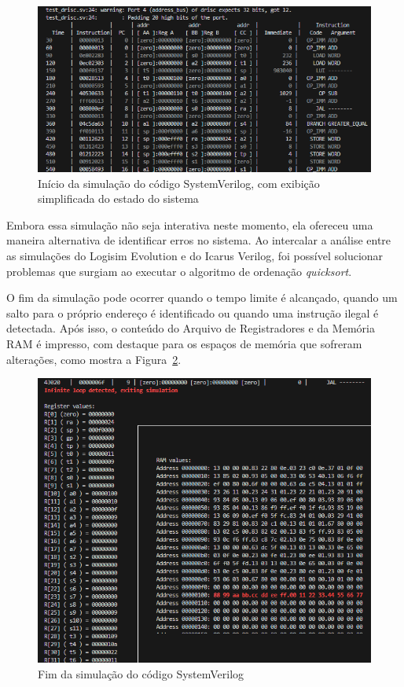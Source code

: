 \documentclass[
	12pt,				%
	openright,			%
	oneside,			%
	a4paper,			%
	english,			%
	french,				%
	spanish,			%
	brazil,				%
	]{abntex2}
\begin{document}
\begin{figure}[h]
    \centering
    \includegraphics[width=0.75\linewidth]{ProcessoDesenvolvimento/Arquitetura/sv_tests1.png}
    \caption{Início da simulação do código SystemVerilog, com exibição simplificada do estado do sistema}
    \label{fig:sv_tests1}
\end{figure}

Embora essa simulação não seja interativa neste momento, ela ofereceu uma maneira alternativa de identificar erros no sistema. Ao intercalar a análise entre as simulações do Logisim Evolution e do Icarus Verilog, foi possível solucionar problemas que surgiam ao executar o algoritmo de ordenação \textit{quicksort}.

O fim da simulação pode ocorrer quando o tempo limite é alcançado, quando um salto para o próprio endereço é identificado ou quando uma instrução ilegal é detectada. Após isso, o conteúdo do Arquivo de Registradores e da Memória RAM é impresso, com destaque para os espaços de memória que sofreram alterações, como mostra a Figura~\ref{fig:sv_tests2}.

\begin{figure}[h]
    \centering
    \includegraphics[width=0.75\linewidth]{ProcessoDesenvolvimento/Arquitetura/sv_testes2.png}
    \caption{Fim da simulação do código SystemVerilog}
    \label{fig:sv_tests2}
\end{figure}
\end{document}
